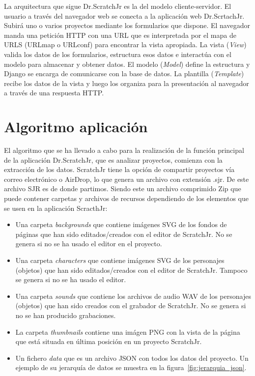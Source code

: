 \documentclass[a4paper, 12pt]{book}
\begin{document}
La arquitectura que sigue Dr.ScratchJr es la del modelo cliente-servidor.
El usuario a través del navegador web se conecta a la aplicación web Dr.ScrtachJr.
Subirá uno o varios proyectos mediante los formularios que dispone. 
El navegador manda una petición HTTP con una URL que es interpretada por el mapa de URLS (URLmap o URLconf) para encontrar la vista apropiada.
La vista (\emph{View}) valida los datos de los formularios, estructura esos datos e interactúa con el modelo para almacenar y obtener datos.
El modelo (\emph{Model}) define la estructura y Django se encarga de comunicarse con la base de datos.
La plantilla (\emph{Template}) recibe los datos de la vista y luego los organiza para la presentación al navegador a través de una respuesta HTTP.

\section{Algoritmo aplicación} 
\label{sec:algoritmo}


\vspace{5mm}
El algoritmo que se ha llevado a cabo para la realización de la función principal de la aplicación Dr.ScratchJr, que es analizar proyectos, comienza con la extracción de los datos.
ScratchJr tiene la opción de compartir proyectos vía correo electrónico o AirDrop, lo que genera un archivo con extensión .sjr.
De este archivo SJR es de donde partimos.
Siendo este un archivo comprimido Zip que puede contener carpetas y archivos de recursos dependiendo de los elementos que se usen en la aplicación ScracthJr:

\begin{itemize}
    \item Una carpeta \emph{backgrounds} que contiene imágenes SVG de los fondos de páginas que han sido editados/creados con el editor de ScratchJr.
    No se genera si no se ha usado el editor en el proyecto.
    \item Una carpeta \emph{characters} que contiene imágenes SVG de los personajes (objetos) que han sido editados/creados con el editor de ScratchJr.
    Tampoco se genera si no se ha usado el editor.
    \item Una carpeta \emph{sounds} que contiene los archivos de audio WAV de los personajes (objetos) que han sido creados con el grabador de ScratchJr.
    No se genera si no se han producido grabaciones.
    \item La carpeta \emph{thumbnails} contiene una imágen PNG con la vista de la página que está situada en última posición en un proyecto ScratchJr.
    \item Un fichero \emph{data} que es un archivo JSON con todos los datos del proyecto. Un ejemplo de su jerarquía de datos se muestra en la figura~\ref{fig:jerarquia_json}.
\end{itemize}
\end{document}
